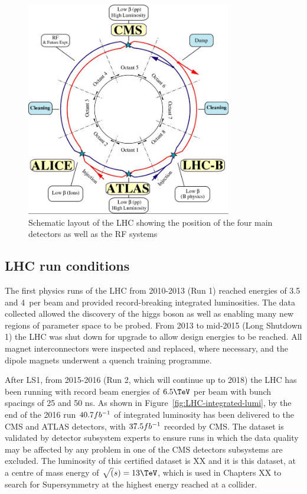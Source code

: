 \begin{figure}
\centering
    \includegraphics[width=0.8\textwidth]{./Figures/detector/lhcDiagram}
  \caption{Schematic layout of the LHC showing the position of the four main detectors as
  well as the RF systems}
  \label{fig:LHC-diagram}
\end{figure}

\subsection{LHC run conditions}

The first physics runs of the LHC from 2010-2013 (Run 1) reached energies of 3.5 and 4\TeV~per beam and 
provided record-breaking integrated luminosities. The data collected allowed the 
discovery of the higgs boson \cite{higgs} as well as enabling many new regions of parameter space
to be probed. From 2013 to mid-2015 (Long Shutdown 1) the LHC was shut down for upgrade to allow design
energies to be reached. All magnet interconnectors were inspected and replaced, where necessary,
and the dipole magnets underwent a quench training programme. 

After LS1, from 2015-2016 (Run 2, which will continue up to 2018) the LHC has been running with record beam energies 
of $6.5\TeV$ per beam with bunch spacings of 25 and 50 ns. 
As shown in Figure~\ref{fig:LHC-integrated-lumi}, by the end of the 2016 run $40.7fb^{-1}$ of integrated luminosity has been 
delivered to the CMS and ATLAS detectors, with $37.5fb^{-1}$ recorded by CMS. The dataset is validated by detector
subsystem experts to ensure runs in which the data quality may be affected by any problem in one of the CMS detectors 
subsystems are excluded. The luminosity of this certified dataset is XX and it is this dataset, 
at a centre of mass energy of $\sqrt(s) = 13\TeV$, 
which is used in Chapters XX to search for Supersymmetry at the highest energy reached at a collider.

